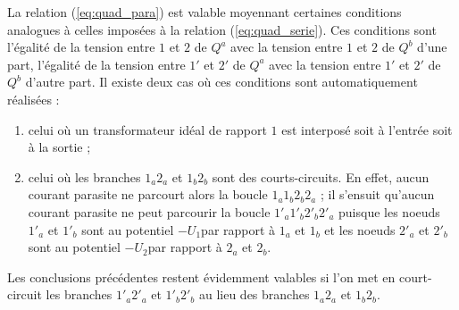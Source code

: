 La relation (\ref{eq:quad_para}) est valable moyennant certaines conditions analogues à celles imposées à la relation (\ref{eq:quad_serie}). Ces conditions sont l'égalité de la tension entre $1$ et $2$ de $Q^a$
avec la tension entre $1$ et $2$ de $Q^b$ d'une part, l'égalité de la tension entre $1'$ et $2'$ de $Q^a$
avec la tension entre $1'$ et $2'$ de $Q^b$ d'autre part.
Il existe deux cas où ces conditions sont automatiquement réalisées :
\begin{enumerate}
\item celui où un transformateur idéal de rapport $1$ est interposé soit à l'entrée soit à la sortie ;
\item celui où les branches $1_a2_a$ et $1_b2_b$ sont des courts-circuits.
En effet, aucun courant parasite ne parcourt alors la boucle $1_a1_b2_b2_a$ ;
il s'ensuit qu'aucun courant parasite ne peut parcourir la boucle $1'_a1'_b2'_b2'_a$  puisque les noeuds $1'_a$ et $1'_b$ sont au potentiel $- U_1 $par rapport à $1_a$ et $1_b$ et les noeuds  $2'_a$ et $2'_b$ sont au potentiel $- U_2 $par rapport à $2_a$ et $2_b$.
\end{enumerate}
Les conclusions précédentes restent évidemment valables si l'on met en court-circuit les branches $1'_a2'_a$ et $1'_b2'_b$ au lieu des branches $1_a2_a$ et $1_b2_b$.






